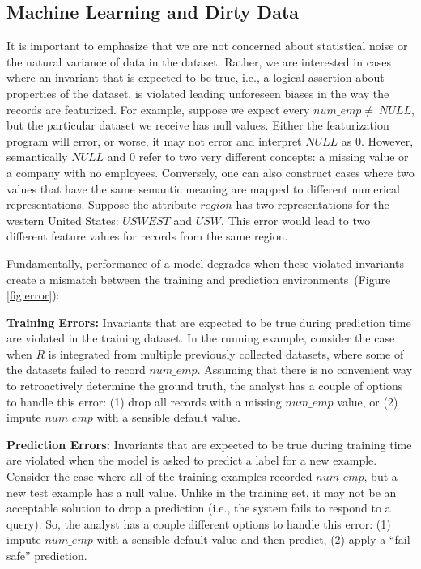 \subsection{Machine Learning and Dirty Data}
It is important to emphasize that we are not concerned about statistical noise or the natural variance of data in the dataset.
Rather, we are interested in cases where an invariant that is expected to be true, i.e., a logical assertion about properties of the dataset, is violated leading unforeseen biases in the way the records are featurized.
For example, suppose we expect every $num\_emp \ne~NULL$, but the particular dataset we receive has null values.
Either the featurization program will error, or worse, it may not error and interpret $NULL$ as $0$.
However, semantically $NULL$ and $0$ refer to two very different concepts: a missing value or a company with no employees.
Conversely, one can also construct cases where two values that have the same semantic meaning are mapped to different numerical representations.
Suppose the attribute $region$ has two representations for the western United States: $USWEST$ and $USW$. 
This error would lead to two different feature values for records from the same region.

Fundamentally, performance of a model degrades when these violated invariants create a mismatch between the training and prediction environments~(Figure \ref{fig:error}):

\vspace{0.5em}\noindent\textbf{Training Errors: } Invariants that are expected to be true during prediction time are violated in the training dataset. In the running example, consider the case when $R$ is integrated from multiple previously collected datasets, where some of the datasets failed to record $num\_emp$. Assuming that there is no convenient way to retroactively determine the ground truth, the analyst has a couple of options to handle this error: (1) drop all records with a missing  $num\_emp$ value, or (2) impute $num\_emp$ with a sensible default value.

\vspace{0.25em}\noindent\textbf{Prediction Errors: } Invariants that are expected to be true during training time are violated when the model is asked to predict a label for a new example. 
Consider the case where all of the training examples recorded $num\_emp$, but a new test example has a null value.
Unlike in the training set, it may not be an acceptable solution to drop a prediction (i.e., the system fails to respond to a query).
So, the analyst has a couple different options to handle this error: (1) impute $num\_emp$ with a sensible default value and then predict, (2) apply a ``fail-safe'' prediction.

